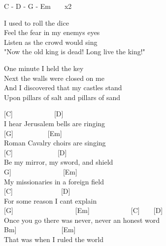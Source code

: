 \documentclass[
  letterpaper,
  a5paper]{memoir}
\begin{document}
C - D - G - Em~~~~x2

I used to roll the dice\\
Feel the fear in my enemy\textquotesingle s eyes\\
Listen as the crowd would sing\\
"Now the old king is dead! Long live the king!"

One minute I held the key\\
Next the walls were closed on me\\
And I discovered that my castles stand\\
Upon pillars of salt and pillars of sand

\begin{tcolorbox}[enhanced jigsaw, breakable, bottomrule=.15mm, colframe=quarto-callout-color-frame, rightrule=.15mm, opacityback=0, colback=white, arc=.35mm, toprule=.15mm, leftrule=.75mm, left=2mm]

{[}C{]}~~~~~~~~~~~~{[}D{]}\\
I hear Jerusalem bells are ringing\\
{[}G{]}~~~~~~~~~~{[}Em{]}\\
Roman Cavalry choirs are singing\\
{[}C{]}~~~~~~~~~~~~~{[}D{]}\\
Be my mirror, my sword, and shield\\
\hspace*{0.333em}\hspace*{0.333em}{[}G{]}~~~~~~~~~~~~~~~{[}Em{]}\\
My missionaries in a foreign field\\
{[}C{]}~~~~~~~~~~~~~~{[}D{]}\\
For some reason I can\textquotesingle t explain\\
{[}G{]}~~~~~~~~~~~~~~~~~~{[}Em{]}~~~~~~~~~~~~{[}C{]}~~~~{[}D{]}\\
Once you go there was never, never an honest word\\
\hspace*{0.333em}\hspace*{0.333em}\hspace*{0.333em}\hspace*{0.333em}\hspace*{0.333em}\hspace*{0.333em}\hspace*{0.333em}\hspace*{0.333em}{[}Bm{]}~~~~~~~~~~~~~{[}Em{]}\\
That was when I ruled the world

\end{tcolorbox}
\end{document}
